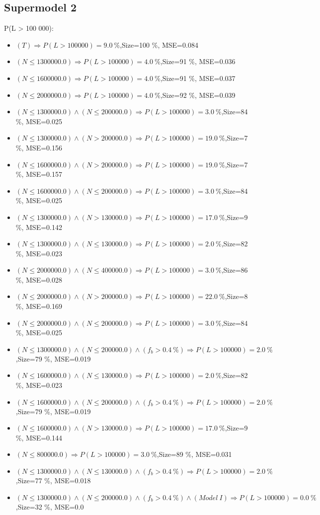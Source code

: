 \documentclass[numbered]{CSL}
\begin{document}
\subsection{Supermodel 2}
P(L > 100 000):
\begin{itemize}
\item $(T) \Rightarrow P(L > 100 000) = 9.0~\%$,\hfill Size=100 \%, MSE=0.084
\item $(N \leq 1300000.0) \Rightarrow P(L > 100 000) = 4.0~\%$,\hfill Size=91 \%, MSE=0.036
\item $(N \leq 1600000.0) \Rightarrow P(L > 100 000) = 4.0~\%$,\hfill Size=91 \%, MSE=0.037
\item $(N \leq 2000000.0) \Rightarrow P(L > 100 000) = 4.0~\%$,\hfill Size=92 \%, MSE=0.039
\item $(N \leq 1300000.0) \land (N \leq 200000.0) \Rightarrow P(L > 100 000) = 3.0~\%$,\hfill Size=84 \%, MSE=0.025
\item $(N \leq 1300000.0) \land (N > 200000.0) \Rightarrow P(L > 100 000) = 19.0~\%$,\hfill Size=7 \%, MSE=0.156
\item $(N \leq 1600000.0) \land (N > 200000.0) \Rightarrow P(L > 100 000) = 19.0~\%$,\hfill Size=7 \%, MSE=0.157
\item $(N \leq 1600000.0) \land (N \leq 200000.0) \Rightarrow P(L > 100 000) = 3.0~\%$,\hfill Size=84 \%, MSE=0.025
\item $(N \leq 1300000.0) \land (N > 130000.0) \Rightarrow P(L > 100 000) = 17.0~\%$,\hfill Size=9 \%, MSE=0.142
\item $(N \leq 1300000.0) \land (N \leq 130000.0) \Rightarrow P(L > 100 000) = 2.0~\%$,\hfill Size=82 \%, MSE=0.023
\item $(N \leq 2000000.0) \land (N \leq 400000.0) \Rightarrow P(L > 100 000) = 3.0~\%$,\hfill Size=86 \%, MSE=0.028
\item $(N \leq 2000000.0) \land (N > 200000.0) \Rightarrow P(L > 100 000) = 22.0~\%$,\hfill Size=8 \%, MSE=0.169
\item $(N \leq 2000000.0) \land (N \leq 200000.0) \Rightarrow P(L > 100 000) = 3.0~\%$,\hfill Size=84 \%, MSE=0.025
\item $(N \leq 1300000.0) \land (N \leq 200000.0) \land (f_b > 0.4~\%) \Rightarrow P(L > 100 000) = 2.0~\%$,\hfill Size=79 \%, MSE=0.019
\item $(N \leq 1600000.0) \land (N \leq 130000.0) \Rightarrow P(L > 100 000) = 2.0~\%$,\hfill Size=82 \%, MSE=0.023
\item $(N \leq 1600000.0) \land (N \leq 200000.0) \land (f_b > 0.4~\%) \Rightarrow P(L > 100 000) = 2.0~\%$,\hfill Size=79 \%, MSE=0.019
\item $(N \leq 1600000.0) \land (N > 130000.0) \Rightarrow P(L > 100 000) = 17.0~\%$,\hfill Size=9 \%, MSE=0.144
\item $(N \leq 800000.0) \Rightarrow P(L > 100 000) = 3.0~\%$,\hfill Size=89 \%, MSE=0.031
\item $(N \leq 1300000.0) \land (N \leq 130000.0) \land (f_b > 0.4~\%) \Rightarrow P(L > 100 000) = 2.0~\%$,\hfill Size=77 \%, MSE=0.018
\item $(N \leq 1300000.0) \land (N \leq 200000.0) \land (f_b > 0.4~\%) \land (Model~I) \Rightarrow P(L > 100 000) = 0.0~\%$,\hfill Size=32 \%, MSE=0.0
\end{itemize}
\end{document}
